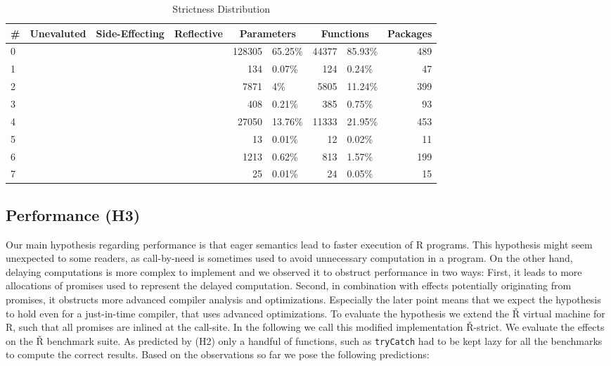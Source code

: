 \documentclass[screen,acmsmall]{acmart}
\newcommand{\xmark}{\color{red} \ding{55}}
\newcommand{\cmark}{\color{green} \ding{51}}
\begin{document}
\begin{table}
  \vspace{-3mm}
  \small
  \caption{Strictness Distribution} \label{table:strictdist}
  \centering
  \begin{tabular}{lcccr|lr|lr}
    \toprule
    \#&\bf Unevaluted & \bf Side-Effecting & \bf Reflective & \multicolumn{2}{c}{\textbf{Parameters}} & \multicolumn{2}{c}{\textbf{Functions}}& \bf Packages\\
    \midrule
    0&\xmark{}&\xmark{}&\xmark{}&128305&65.25\%&44377&85.93\%&489\\
    1&\xmark{}&\xmark{}&\cmark{}&134&0.07\%&124&0.24\%&47\\
    2&\xmark{}&\cmark{}&\xmark{}&7871&4\%&5805&11.24\%&399\\
    3&\xmark{}&\cmark{}&\cmark{}&408&0.21\%&385&0.75\%&93\\
    4&\cmark{}&\xmark{}&\xmark{}&27050&13.76\%&11333&21.95\%&453\\
    5&\cmark{}&\xmark{}&\cmark{}&13&0.01\%&12&0.02\%&11\\
    6&\cmark{}&\cmark{}&\xmark{}&1213&0.62\%&813&1.57\%&199\\
    7&\cmark{}&\cmark{}&\cmark{}&25&0.01\%&24&0.05\%&15\\
    \bottomrule
  \end{tabular}
\end{table}

\subsection{Performance (H3)}

Our main hypothesis regarding performance is that eager semantics lead to faster
execution of R programs. This hypothesis might seem
unexpected to some readers, as call-by-need is sometimes used to avoid
unnecessary computation in a program. On the other hand, delaying computations
is more complex to implement and we observed it to obstruct performance
in two ways: First, it leads to more allocations of promises used to represent
the delayed computation. Second, in combination with effects potentially
originating from promises, it obstructs more advanced compiler analysis and
optimizations. Especially the later point means that we expect the hypothesis to
hold even for a just-in-time compiler, that uses advanced optimizations.
To evaluate the hypothesis we extend the Ř virtual machine for R, such that all
promises are inlined at the call-site. In the following we call this modified
implementation Ř-strict. We evaluate the effects on the Ř benchmark
suite. As predicted by (H2) only a handful of functions, such as
\lstinline{tryCatch} had to be kept lazy for all the benchmarks to compute the
correct results. Based on the observations so far we pose the following predictions:
\end{document}
